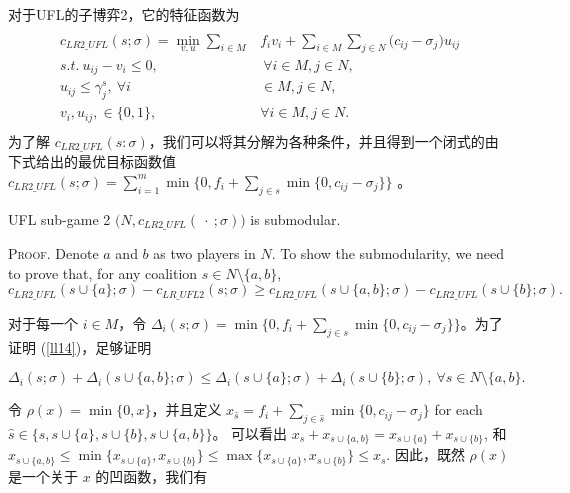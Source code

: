 \documentclass[UTF8]{article}
\begin{document}
\begin{定义}
对于UFL的子博弈2，它的特征函数为
\begin{eqnarray}\label{eqn:UFLCFsub2}
\begin{aligned}
\begin{split}
c_{LR2\_UFL}(s;\sigma) = \min_{v,u} \sum_{i \in M} &f_iv_i + \sum_{i \in M} \sum_{j \in N} \big(c_{ij} - \sigma_{j}\big)u_{ij}\\
s.t.~u_{ij} - v_i \leq 0,&~\forall i \in M, j \in N,\\
u_{ij} \leq \gamma_j^s,~\forall i& \in M, j \in N,\\
 v_i,u_{ij}, \in \{0,1\},~&\forall i \in M, j \in N.
\end{split}
\end{aligned}
\end{eqnarray}
为了解 $c_{LR2\_UFL}(s:\sigma)$，我们可以将其分解为各种条件，并且得到一个闭式的由下式给出的最优目标函数值 $c_{LR2\_UFL}(s;\sigma) = \sum_{i=1}^m \min \big\{0,f_i+\sum_{j \in s} \min \{0,c_{ij}-\sigma_j\}\big\}$ 。

\begin{lemma}\label{lemma:UFLSubmodular}
UFL sub-game 2 $\big(N,c_{LR2\_UFL}(\ \cdot \ ;\sigma)\big)$ is submodular.
\end{lemma}
{\scshape Proof.}
Denote $a$ and $b$ as two players in $N$. To show the submodularity, we need to prove that, for any coalition $s \in N\setminus \big\{a,b\big\}$,
\begin{equation}\label{ll14}
c_{LR2\_UFL}(s \cup \{a\}; \sigma) - c_{LR\_UFL2}(s;\sigma) \geq c_{LR2\_UFL}(s \cup \big\{a,b\big\};\sigma) - c_{LR2\_UFL}(s \cup \{b\};\sigma).
\end{equation}

对于每一个 $i\in M$，令 $\Delta_i(s;\sigma) = \min \{0, f_i + \sum_{j \in s} \min \{0, c_{ij} - \sigma_j\} \}$。为了证明 (\ref{ll14})，足够证明

\begin{equation}\label{eqn:submodularufl}
\Delta_i(s;\sigma) + \Delta_i(s \cup \{a,b\};\sigma) \leq \Delta_i(s \cup \{a\};\sigma) + \Delta_i(s \cup \{b\};\sigma), ~\forall s \in N\setminus\big\{a,b\big\}. \end{equation}

令 $\rho(x)=\min\{0,x\}$，并且定义 $x_{\hat{s}}= f_i + \sum_{j \in \hat{s}} \min \{0, c_{ij} - \sigma_j\}$ for each $\hat{s}\in \{s,s\cup\{a\},s\cup\{b\},s\cup\{a,b\}\}$。
可以看出 $x_s+x_{s\cup\{a,b\}} = x_{s\cup \{a\}}+x_{s\cup\{b\}}$, 和 $x_{s\cup\{a,b\}}\leq \min\{x_{s\cup \{a\}},x_{s\cup\{b\}}\}\leq  \max\{x_{s\cup \{a\}},x_{s\cup\{b\}}\} \leq x_{s}$.
因此，既然 $\rho(x)$ 是一个关于 $x$ 的凹函数，我们有


\end{定义}
\end{document}
